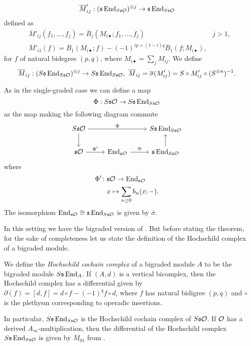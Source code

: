 \documentclass[Thesis.tex]{subfiles}
\begin{document}
\begin{equation}\label{barbimaps}
\overline{M}'_{ij}:(\mathfrak{s}\operatorname{End}_{S\mathfrak{s}{\mathcal O}})^{\otimes j}\to \mathfrak{s}\operatorname{End}_{S\mathfrak{s}{\mathcal O}}
\end{equation}
defined as 
\begin{align*}
&\overline{M}'_{ij}(f_1,\dots,f_j)=\overline{B}_j(M_{i\bullet};f_1,\dots, f_j) & j>1,\\
&\overline{M}'_{i1}(f)=\overline{B}_1(M_{i\bullet};f)-(-1)^{ip+(1-i)q}\overline{B}_1(f;M_{i\bullet}),
\end{align*}
for $f$ of natural bidegree $(p,q)$, where $M_{i\bullet}=\sum_j M_{ij}$. We define 
\[\overline{M}_{ij}:(S\mathfrak{s}\operatorname{End}_{S\mathfrak{s}{\mathcal O}})^{\otimes j}\to S\mathfrak{s}\operatorname{End}_{S\mathfrak{s}{\mathcal O}},\ \overline{M}_{ij} = \overline{\sigma}(M'_{ij})=S\circ M'_{ij}\circ (S^{\otimes n})^{-1}.\]

As in the single-graded case we can define a map
\[\Phi:S\mathfrak{s}{\mathcal O}\to S\mathfrak{s}\operatorname{End}_{S\mathfrak{s}{\mathcal O}}\]
as the map making the following diagram commute
\begin{equation}\label{derivedPhi}
\begin{tikzcd}
S\s\OO\arrow[rr, "\Phi"]\arrow[d] & & S\s\End_{S\s\OO}\\
\s\OO\arrow[r, "\Phi'"]& \End_{\s\OO}\arrow[r, "\cong"]& \s\End_{S\s\OO}\arrow[u]
\end{tikzcd}
\end{equation}
where 
\begin{align*}
\Phi'\colon&\mathfrak{s}{\mathcal O} \to \operatorname{End}_{\mathfrak{s}{\mathcal O}}\\
&x\mapsto \sum_{n\geq 0}b_n(x;-).
\end{align*}
The isomorphism $\operatorname{End}_{\mathfrak{s}{\mathcal O}}\cong\mathfrak{s}\operatorname{End}_{S\mathfrak{s}{\mathcal O}}$ is given by $\overline{\sigma}$.

In this setting we have the bigraded version of . But before stating the theorem, for the sake of completeness let us state the definition of the Hochschild complex of a bigraded module.
\begin{defin}
We define the \emph{Hochschild cochain complex} of a bigraded module $A$ to be the bigraded module $S\mathfrak{s}\operatorname{End}_A$. If $(A,d)$ is a vertical bicomplex, then the Hochschild complex has a differential given by $\partial(f)=[d,f]=d\circ f-(-1)^{q}f\circ d$, where $f$ has natural bidigree $(p,q)$ and $\circ$ is the plethysm corresponding to operadic insertions.
\end{defin}
In particular, $S\mathfrak{s}\operatorname{End}_{S\mathfrak{s}{\mathcal O}}$ is the Hochschild cochain complex of $S\mathfrak{s}{\mathcal O}$. If ${\mathcal O}$ has a derived $A_\infty$-multiplication, then the differential of the Hochschild complex $S\mathfrak{s}\operatorname{End}_{S\mathfrak{s}{\mathcal O}}$ is given by $\overline{M}_{01}$ from .
\end{document}
